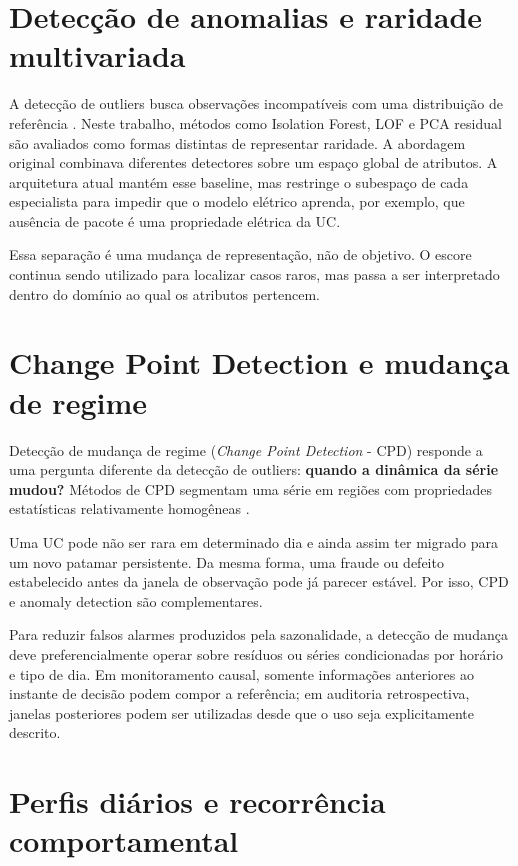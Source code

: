 \section{Detecção de anomalias e raridade multivariada}\label{detecuxe7uxe3o-de-anomalias-e-raridade-multivariada}

A detecção de outliers busca observações incompatíveis com uma distribuição de referência \autocite{aggarwal2017}. Neste trabalho, métodos como Isolation Forest, LOF e PCA residual são avaliados como formas distintas de representar raridade. A abordagem original combinava diferentes detectores sobre um espaço global de atributos. A arquitetura atual mantém esse baseline, mas restringe o subespaço de cada especialista para impedir que o modelo elétrico aprenda, por exemplo, que ausência de pacote é uma propriedade elétrica da UC.

Essa separação é uma mudança de representação, não de objetivo. O escore continua sendo utilizado para localizar casos raros, mas passa a ser interpretado dentro do domínio ao qual os atributos pertencem.

\section{Change Point Detection e mudança de regime}\label{change-point-detection-e-mudanuxe7a-de-regime}

Detecção de mudança de regime (\emph{Change Point Detection} - CPD) responde a uma pergunta diferente da detecção de outliers: \textbf{quando a dinâmica da série mudou?} Métodos de CPD segmentam uma série em regiões com propriedades estatísticas relativamente homogêneas \autocite{truong2020}.

Uma UC pode não ser rara em determinado dia e ainda assim ter migrado para um novo patamar persistente. Da mesma forma, uma fraude ou defeito estabelecido antes da janela de observação pode já parecer estável. Por isso, CPD e anomaly detection são complementares.

Para reduzir falsos alarmes produzidos pela sazonalidade, a detecção de mudança deve preferencialmente operar sobre resíduos ou séries condicionadas por horário e tipo de dia. Em monitoramento causal, somente informações anteriores ao instante de decisão podem compor a referência; em auditoria retrospectiva, janelas posteriores podem ser utilizadas desde que o uso seja explicitamente descrito.

\section{Perfis diários e recorrência comportamental}\label{perfis-diuxe1rios-e-recorruxeancia-comportamental}

